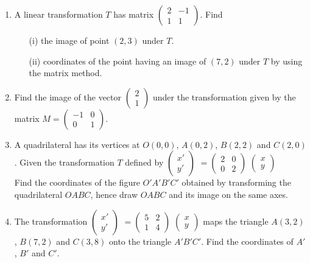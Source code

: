 \begin{enumerate}
	\item A linear transformation $T$ has matrix $\begin{pmatrix}
	2 & -1 \\
	1 & 1
	\end{pmatrix}$. Find 
		\begin{itemize}
		\item[(i)] the image of point $(2,3)$ under $T$.
		\item[(ii)] coordinates of the point having an image of $(7,2)$ under $T$ by using the matrix method.
		\end{itemize}
		
	\item Find the image of the vector $
	\begin{pmatrix}
	2 \\
	1
	\end{pmatrix}$ under the transformation given by the matrix $M =
	\begin{pmatrix}
	-1 & 0 \\
	0 & 1
	\end{pmatrix}$.
		
	\item A quadrilateral has its vertices at $O(0,0)$, $A(0,2)$, $B(2,2)$ and $C(2,0)$. Given the transformation $T$ defined by $
	\begin{pmatrix}
	x' \\
	y'
	\end{pmatrix}$ $ =
	\begin{pmatrix}
	2 & 0 \\
	0 & 2
	\end{pmatrix}$ $
	\begin{pmatrix}
	x \\
	y
	\end{pmatrix}$\\
	Find the coordinates of the figure $O'A'B'C'$ obtained by transforming the quadrilateral $OABC$, hence draw $OABC$ and its image on the same axes.
	
	\item The transformation $
	\begin{pmatrix}
	x' \\
	y'
	\end{pmatrix}$ $ =
	\begin{pmatrix}
	5 & 2 \\
	1 & 4
	\end{pmatrix}$ $
	\begin{pmatrix}
	x \\
	y
	\end{pmatrix}$ maps the triangle $A(3,2)$, $B(7,2)$ and $C(3,8)$ onto the triangle $A'B'C'$. Find the coordinates of $A'$, $B'$ and $C'$.
	

\end{enumerate}
